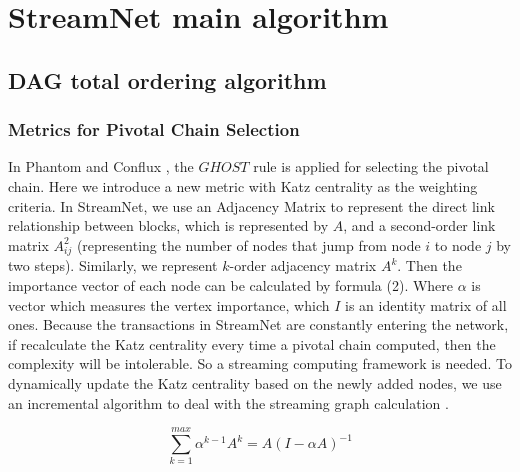 \section{StreamNet main algorithm}



\subsection{DAG total ordering algorithm}

\subsubsection{Metrics for Pivotal Chain Selection}
In Phantom \cite{sompolinskyphantom} and Conflux \cite{li2018scaling}, the $GHOST$ rule \cite{sompolinsky2015secure} is applied for selecting the pivotal chain.
Here we introduce a new metric with Katz centrality \cite{katz1953new} as the weighting criteria. 
In StreamNet, we use an Adjacency Matrix to represent the direct link relationship between blocks, which is represented by $A$,
and a second-order link matrix $A^2_{ij}$ (representing the number of nodes that jump from node $i$ to node $j$ by two steps).
Similarly, we represent $k$-order adjacency matrix $A^k$.
Then the importance vector of each node can be calculated by formula (2). 
Where $\alpha$ is vector which measures the vertex importance, which $I$ is an identity matrix of all ones.
Because the transactions in StreamNet are constantly entering the network, 
if recalculate the Katz centrality every time a pivotal chain computed, 
then the complexity will be intolerable. 
So a streaming computing framework is needed. 
To dynamically update the Katz centrality based on the newly added nodes, 
we use an incremental algorithm to deal with the streaming graph calculation \cite{nathan2018incrementally}.

\begin{equation}
\label{simple_equation}
\sum_{k=1}^{max} \alpha^{k-1}A^{k}=A(I-\alpha A)^{-1}
\end{equation}

